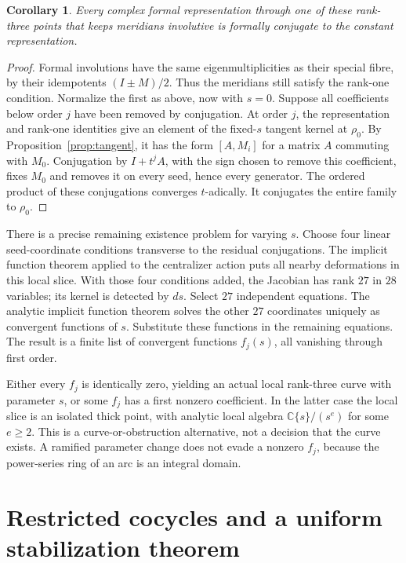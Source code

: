 \documentclass[11pt]{article}
\newtheorem{corollary}[theorem]{Corollary}
\newcommand{\C}{\mathbb C}
\begin{document}
\begin{corollary}\label{cor:fixed}
Every complex formal representation through one of these rank-three
points that keeps meridians involutive is formally conjugate to the
constant representation.
\end{corollary}
\begin{proof}
Formal involutions have the same eigenmultiplicities as their special
fibre, by their idempotents $(I\pm M)/2$. Thus the meridians still
satisfy the rank-one condition. Normalize the first as above, now
with $s=0$. Suppose all coefficients below order $j$ have been
removed by conjugation. At order $j$, the representation and
rank-one identities give an element of the fixed-$s$ tangent kernel
at $\rho_0$. By Proposition~\ref{prop:tangent}, it has the form
$[A,M_i]$ for a matrix $A$ commuting with $M_0$.
Conjugation by $I+t^jA$, with the sign chosen to remove this
coefficient, fixes $M_0$ and removes it on every seed, hence every
generator. The ordered product of these conjugations converges
$t$-adically. It conjugates the entire family to $\rho_0$.
\end{proof}

There is a precise remaining existence problem for varying $s$.
Choose four linear seed-coordinate conditions transverse to the
residual conjugations. The implicit function theorem applied to
the centralizer action puts all nearby deformations in this local
slice. With those four conditions added, the Jacobian has rank
$27$ in $28$ variables; its kernel is detected by $ds$.
Select $27$ independent equations. The analytic implicit function
theorem solves the other $27$ coordinates uniquely as convergent
functions of $s$. Substitute these functions in the remaining
equations. The result is a finite list of convergent functions
$f_j(s)$, all vanishing through first order.

Either every $f_j$ is identically zero, yielding an actual local
rank-three curve with parameter $s$, or some $f_j$ has a first
nonzero coefficient. In the latter case the local slice is an
isolated thick point, with analytic local algebra
$\C\{s\}/(s^e)$ for some $e\ge2$. This is a curve-or-obstruction
alternative, not a decision that the curve exists. A ramified
parameter change does not evade a nonzero $f_j$, because the
power-series ring of an arc is an integral domain.

\section{Restricted cocycles and a uniform stabilization theorem}
\end{document}

